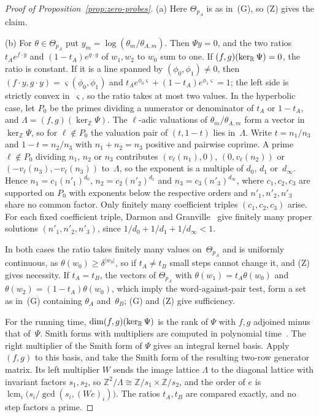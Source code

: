 \begin{proof}[Proof of Proposition~\ref{prop:zero-probes}]
(a) Here $\Theta_{p_A}$ is as in~(G), so (Z) gives the claim.

(b) For $\theta\in\Theta_{p_A}$ put $y_m=\log(\theta_m/\theta_{A,m})$.
Then $\Psi y=0$, and the two ratios $t_Ae^{f\cdot y}$ and $(1-t_A)e^{g\cdot y}$ of $w_1,w_2$
to $w_0$ sum to one. If
$(f,g)(\ker_{\mathbb{R}}\Psi)=0$, the ratio is constant. If it is a line spanned by
$(\phi_0,\phi_1)\neq0$, then $(f\cdot y,g\cdot
y)=\varsigma(\phi_0,\phi_1)$ and
$t_Ae^{\phi_0\varsigma}+(1-t_A)e^{\phi_1\varsigma}=1$; the left side is
strictly convex in~$\varsigma$, so the ratio takes at most two values. In
the hyperbolic case, let $P_0$ be the primes dividing a numerator or
denominator of $t_A$ or $1-t_A$, and $\Lambda=(f,g)(\ker_{\mathbb Z}\Psi)$.
The $\ell$-adic valuations of $\theta_m/\theta_{A,m}$ form a vector in
$\ker_{\mathbb Z}\Psi$, so for $\ell\notin P_0$ the valuation pair of
$(t,1-t)$ lies in~$\Lambda$. Write
$t=n_1/n_3$ and $1-t=n_2/n_3$ with $n_1+n_2=n_3$ positive and pairwise
coprime. A prime $\ell\notin P_0$ dividing $n_1$, $n_2$ or $n_3$
contributes $(v_\ell(n_1),0)$, $(0,v_\ell(n_2))$ or
$(-v_\ell(n_3),-v_\ell(n_3))$ to~$\Lambda$, so the exponent is a multiple
of $d_0$, $d_1$ or~$d_\infty$. Hence $n_1=c_1(n'_1)^{d_0}$,
$n_2=c_2(n'_2)^{d_1}$ and $n_3=c_3(n'_3)^{d_\infty}$, where $c_1,c_2,c_3$
are supported on $P_0$ with exponents below the respective orders and
$n'_1,n'_2,n'_3$ share no common factor. Only finitely many coefficient
triples $(c_1,c_2,c_3)$ arise. For each fixed coefficient triple, Darmon
and Granville~\cite[Theorem~2]{darmongranville} give finitely many proper
solutions $(n'_1,n'_2,n'_3)$, since $1/d_0+1/d_1+1/d_\infty<1$.

In both cases the ratio takes finitely many values on~$\Theta_{p_A}$ and is
uniformly continuous, as $\theta(w_0)\ge\delta^{|w_0|}$, so if
$t_A\neq t_B$ small steps cannot change it, and (Z) gives necessity. If
$t_A=t_B$, the vectors of $\Theta_{p_A}$ with $\theta(w_1)=t_A\theta(w_0)$
and $\theta(w_2)=(1-t_A)\theta(w_0)$, which imply the word-against-pair
test, form a set as in~(G) containing $\theta_A$ and~$\theta_B$; (G) and
(Z) give sufficiency.

For the running time, $\dim(f,g)(\ker_{\mathbb{R}}\Psi)$ is the rank of $\Psi$
with $f,g$ adjoined minus that of~$\Psi$. Smith forms with multipliers are computed in polynomial
time~\cite[Theorems~4--5 and the rectangular extension following
Theorem~5]{kannanbachem}. %
The right multiplier of the Smith form of $\Psi$ gives an integral kernel
basis. Apply $(f,g)$ to this basis, and take the Smith form of the
resulting two-row generator matrix. Its left multiplier $W$ sends the image
lattice $\Lambda$ to the diagonal lattice with invariant factors
$s_1,s_2$, so $\mathbb Z^2/\Lambda\cong\mathbb Z/s_1\times\mathbb Z/s_2$,
and the order of $e$ is
$\operatorname{lcm}_i\bigl(s_i/\gcd(s_i,(We)_i)\bigr)$. The ratios
$t_A,t_B$ are compared exactly, and no step factors a prime.
\end{proof}

